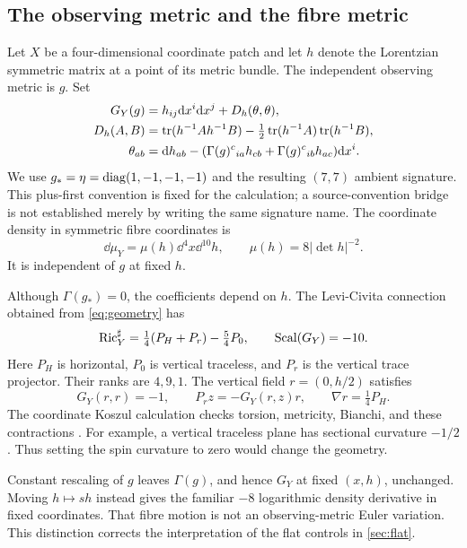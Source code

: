 \subsection{The observing metric and the fibre metric}
Let $X$ be a four-dimensional coordinate patch and let $h$ denote the
Lorentzian symmetric matrix at a point of its metric bundle. The independent
observing metric is $g$. Set
\begin{align}
 G_Y(g)&=h_{ij}\mathrm d x^i\mathrm d x^j+D_h(\theta,\theta),\label{eq:geometry}\\
 D_h(A,B)&=\operatorname{tr}(h^{-1}Ah^{-1}B)
       -\tfrac12\operatorname{tr}(h^{-1}A)\operatorname{tr}(h^{-1}B),\nonumber\\
 \theta_{ab}&=\mathrm d h_{ab}
 -(\Gamma(g)^c{}_{ia}h_{cb}+\Gamma(g)^c{}_{ib}h_{ac})\mathrm d x^i.
 \nonumber
\end{align}
We use $g_*=\eta=\operatorname{diag}(1,-1,-1,-1)$ and the resulting $(7,7)$ ambient
signature. This plus-first convention is fixed for the calculation; a
source-convention bridge is not established merely by writing the same
signature name. The coordinate density in symmetric fibre coordinates is
\begin{equation}
 \dd\mu_Y=\mu(h)\dd^4x\dd^{10}h,
 \qquad \mu(h)=8|\det h|^{-2}.\label{eq:density}
\end{equation}
It is independent of $g$ at fixed $h$.

Although $\Gamma(g_*)=0$, the coefficients depend on $h$.
The Levi-Civita connection obtained from \eqref{eq:geometry} has
\begin{equation}
 \operatorname{Ric}_Y^\sharp=\tfrac14(P_H+P_r)-\tfrac54P_0,
 \qquad \operatorname{Scal}(G_Y)=-10.\label{eq:ricci}
\end{equation}
Here $P_H$ is horizontal, $P_0$ is vertical traceless, and $P_r$ is the
vertical trace projector. Their ranks are $4,9,1$. The vertical field
$r=(0,h/2)$ satisfies
\begin{equation}
 G_Y(r,r)=-1,\qquad P_rz=-G_Y(r,z)r,
 \qquad \nabla r=\tfrac14P_H.\label{eq:radial}
\end{equation}
The coordinate Koszul calculation checks torsion, metricity, Bianchi, and
these contractions \cite{GeometryAssessment}. For example, a vertical
traceless plane has sectional curvature $-1/2$. Thus setting the spin
curvature to zero would change the geometry.

Constant rescaling of $g$ leaves $\Gamma(g)$, and hence $G_Y$ at fixed
$(x,h)$, unchanged. Moving $h\mapsto sh$ instead gives the familiar
$-8$ logarithmic density derivative in fixed coordinates. That fibre
motion is not an observing-metric Euler variation. This distinction
corrects the interpretation of the flat controls in \cref{sec:flat}.


